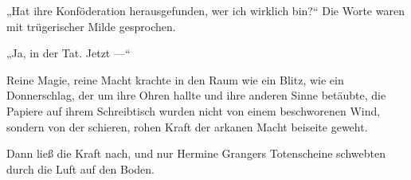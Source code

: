 „Hat ihre Konföderation herausgefunden, wer ich wirklich bin?“ Die Worte waren mit trügerischer Milde gesprochen.

„Ja, in der Tat. Jetzt —“

Reine Magie, reine Macht krachte in den Raum wie ein Blitz, wie ein Donnerschlag, der um ihre Ohren hallte und ihre anderen Sinne betäubte, die Papiere auf ihrem Schreibtisch wurden nicht von einem beschworenen Wind, sondern von der schieren, rohen Kraft der arkanen Macht beiseite geweht.

Dann ließ die Kraft nach, und nur Hermine Grangers Totenscheine schwebten durch die Luft auf den Boden.

